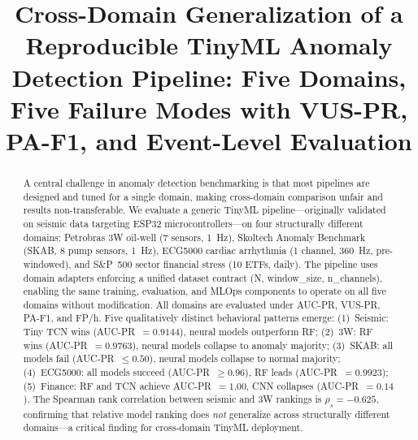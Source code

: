 \documentclass[conference]{IEEEtran}
\def\\{}%
\def\texttt#1{#1}%
\begin{document}
\title{Cross-Domain Generalization of a Reproducible TinyML\\
Anomaly Detection Pipeline: Five Domains, Five Failure Modes\\
with VUS-PR, PA-F1, and Event-Level Evaluation}

\author{
  \IEEEauthorblockA{
    \textit{[Department]}\\
    \textit{[Institution]}\\
    [City, Country]\\
    [email]
  }
}

\maketitle

\begin{abstract}
A central challenge in anomaly detection benchmarking is that most pipelines
are designed and tuned for a single domain, making cross-domain comparison
unfair and results non-transferable.
We evaluate a generic TinyML pipeline---originally validated on seismic data
targeting ESP32 microcontrollers---on four structurally different domains:
Petrobras 3W oil-well (7 sensors, 1~Hz), Skoltech Anomaly Benchmark
(SKAB, 8 pump sensors, 1~Hz), ECG5000 cardiac arrhythmia (1 channel,
360~Hz, pre-windowed), and S\&P~500 sector financial stress (10 ETFs, daily).
The pipeline uses domain adapters enforcing a unified dataset contract
\texttt{(N, window\_size, n\_channels)}, enabling the same training,
evaluation, and MLOps components to operate on all five domains without
modification.
All domains are evaluated under AUC-PR, VUS-PR, PA-F1, and FP/h.
Five qualitatively distinct behavioral patterns emerge:
(1)~Seismic: Tiny TCN wins (AUC-PR~$=0.9144$), neural models outperform RF;
(2)~3W: RF wins (AUC-PR~$=0.9763$), neural models collapse to anomaly majority;
(3)~SKAB: all models fail (AUC-PR~$\leq0.50$), neural models collapse to normal majority;
(4)~ECG5000: all models succeed (AUC-PR~$\geq0.96$), RF leads (AUC-PR~$=0.9923$);
(5)~Finance: RF and TCN achieve AUC-PR~$=1.00$, CNN collapses (AUC-PR~$=0.14$).
The Spearman rank correlation between seismic and 3W rankings is $\rho_s = -0.625$,
confirming that relative model ranking does \emph{not} generalize across
structurally different domains---a critical finding for cross-domain TinyML deployment.
\end{abstract}
\end{document}
